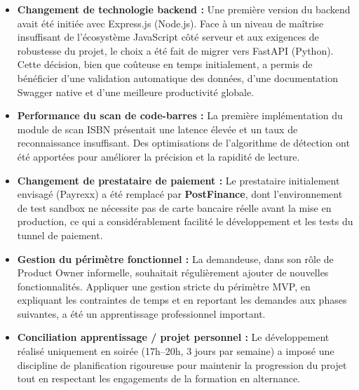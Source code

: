 \documentclass[12pt, a4paper]{report}
\renewcommand{\_}{\origunderscore\allowbreak}
\begin{document}
\begin{itemize}
    \item \textbf{Changement de technologie backend :} Une première version du backend avait été initiée avec Express.js (Node.js). Face à un niveau de maîtrise insuffisant de l'écosystème JavaScript côté serveur et aux exigences de robustesse du projet, le choix a été fait de migrer vers FastAPI (Python). Cette décision, bien que coûteuse en temps initialement, a permis de bénéficier d'une validation automatique des données, d'une documentation Swagger native et d'une meilleure productivité globale.
    \item \textbf{Performance du scan de code-barres :} La première implémentation du module de scan ISBN présentait une latence élevée et un taux de reconnaissance insuffisant. Des optimisations de l'algorithme de détection ont été apportées pour améliorer la précision et la rapidité de lecture.
    \item \textbf{Changement de prestataire de paiement :} Le prestataire initialement envisagé (Payrexx) a été remplacé par \textbf{PostFinance}, dont l'environnement de test sandbox ne nécessite pas de carte bancaire réelle avant la mise en production, ce qui a considérablement facilité le développement et les tests du tunnel de paiement.
    \item \textbf{Gestion du périmètre fonctionnel :} La demandeuse, dans son rôle de Product Owner informelle, souhaitait régulièrement ajouter de nouvelles fonctionnalités. Appliquer une gestion stricte du périmètre MVP, en expliquant les contraintes de temps et en reportant les demandes aux phases suivantes, a été un apprentissage professionnel important.
    \item \textbf{Conciliation apprentissage / projet personnel :} Le développement réalisé uniquement en soirée (17h–20h, 3 jours par semaine) a imposé une discipline de planification rigoureuse pour maintenir la progression du projet tout en respectant les engagements de la formation en alternance.

\end{itemize}
\end{document}
